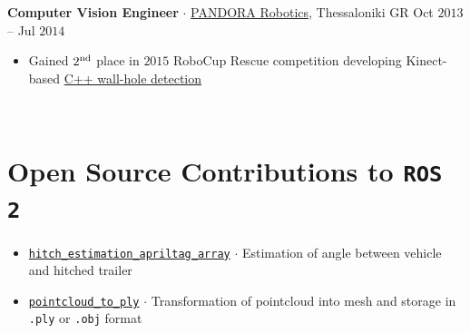 \documentclass[a4paper,10pt,twoside]{article}
\begin{document}
\noindent \textbf{Computer Vision Engineer} $\cdot$ \href{https://issel.ee.auth.gr/pandora-robotics/}{PANDORA Robotics}, Thessaloniki GR \hfill {\small \textcolor{agray}{Oct $2013$ -- Jul $2014$}}
  \begin{minipage}[t]{\textwidth}
    \begin{itemize}
      \item Gained $2^{\textnormal{nd}}$ place in $2015$ RoboCup Rescue competition developing Kinect-based  \href{https://github.com/li9i/pandora\_vision\_2014}{C++ wall-hole detection}
    \end{itemize}
  \end{minipage} \\ [-0.8em]

\verticalspacebetweensections

\section{\textbf{Open Source Contributions to \texttt{ROS 2}}}\verticalspacebetweensectionandcontent

  \noindent\begin{minipage}[t]{\textwidth}
    \begin{itemize}
      \item \href{https://index.ros.org/p/hitch_estimation_apriltag_array/#humble}{\texttt{hitch\_estimation\_apriltag\_array}} $\cdot$ Estimation of angle between vehicle and hitched trailer \verticalspaceafteritem
      \item \href{https://index.ros.org/p/pointcloud_to_ply/#humble}{\texttt{pointcloud\_to\_ply}} $\cdot$ Transformation of pointcloud into mesh and storage in \texttt{.ply} or \texttt{.obj} format
    \end{itemize}
  \end{minipage} \\ [0.2em]

\verticalspacebetweensections

\end{document}
